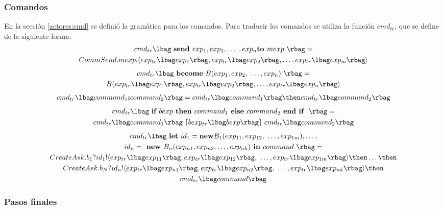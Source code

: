 \subsubsection*{Comandos}

En la sección \ref{actores:cmd} se definió la gramática para los comandos. Para traducir los comandos se utiliza la función $cmd_{tr}$, que se define de la siguiente forma:
\begin{multline*}
cmd_{tr}\func{\ \textbf{send } exp_1, exp_2, \ldots\ , exp_n \textbf{to } mexp\ } = \\
CommSend.mexp. \langle exp_{tr}\func{exp_1}, exp_{tr}\func{exp_2}, \ldots, exp_{tr}\func{exp_m} \rangle
\end{multline*}
\begin{multline*}
cmd_{tr} \func{\ \textbf{become}\ B(exp_1, exp_2,\ \ldots, exp_n)\ } = \\
B(exp_{tr}\func{exp_1}, exp_{tr}\func{exp_2}, \ldots, exp_{tr}\func{exp_n} \rangle
\end{multline*}
\begin{multline*}
cmd_{tr}\func{command_1 \textbf{;} command_2} = cmd_{tr}\func{command_1} \then cmd_{tr}\func{command_2}
\end{multline*}
\begin{multline*}
cmd_{tr} \func{\ \textbf{if } bexp \textbf{ then } command_1 \textbf{ else } command_2 \textbf{ end if }\ } = \\
 cmd_{tr}\func{command_1}\ \lceil bexp_{tr}\func{bexp} \rceil\ cmd_{tr}\func{command_2}
\end{multline*}
\begin{multline*}
cmd_{tr}\func{\ \textbf{let}\ id_1 = \textbf{new} B_1(exp_{11}, exp_{12},\ \ldots, exp_{1m}), \ldots, \\
id_n = \textbf{ new }B_n(exp_{n1}, exp_{n2},\ldots, exp_{nk}) \textbf{ in }command\ } = \\
CreateAsk.b_1?id_1! \langle exp_{tr}\func{exp_{11}}, exp_{tr}\func{exp_{12}},\ \ldots, exp_{tr}\func{exp_{1m}} \rangle \then \ldots \then \\
CreateAsk.b_N?id_n! \langle exp_{tr}\func{exp_{n1}}, exp_{tr}\func{exp_{n2}},\ \ldots, exp_{tr}\func{exp_{nk}} \rangle \then  \\ 
cmd_{tr}\func{command}
\end{multline*}

\subsubsection*{Pasos finales}

